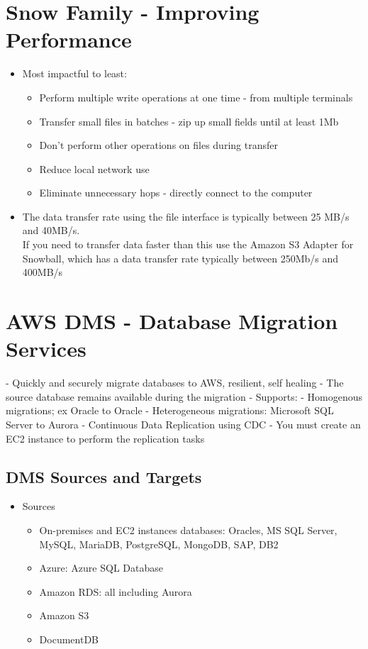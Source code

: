 {{\section{Snow Family - Improving Performance}

\begin{itemize}
    \item Most impactful to least:
    \begin{itemize}
        \item Perform multiple write operations at one time - from multiple terminals
        \item Transfer small files in batches - zip up small fields until at least 1Mb
        \item Don't perform other operations on files during transfer
        \item Reduce local network use
        \item Eliminate unnecessary hops - directly connect to the computer
    \end{itemize}

    \item The data transfer rate using the file interface is typically between 25 MB/s and 40MB/s.\\
    If you need to transfer data faster than this use the Amazon S3 Adapter for Snowball, which has a data transfer rate typically between 250Mb/s and 400MB/s
\end{itemize}


\section{AWS DMS - Database Migration Services}
- Quickly and securely migrate databases to AWS, resilient, self healing
- The source database remains available during the migration
- Supports:
- Homogenous migrations; ex Oracle to Oracle
- Heterogeneous migrations: Microsoft SQL Server to Aurora
- Continuous Data Replication using CDC
- You must create an EC2 instance to perform the replication tasks

\subsection{DMS Sources and Targets}
\begin{itemize}
    \item Sources
    \begin{itemize}
        \item On-premises and EC2 instances databases: Oracles, MS SQL Server, MySQL, MariaDB, PostgreSQL, MongoDB, SAP, DB2
        \item Azure: Azure SQL Database
        \item Amazon RDS: all including Aurora
        \item Amazon S3
        \item DocumentDB
    \end{itemize}


\end{itemize}}}
